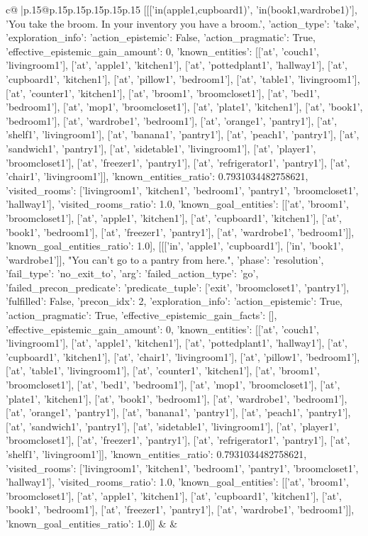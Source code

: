\documentclass{article}
\begin{document}
{\begin{supertabular}{c@{$\;$}|p{.15\linewidth}@{}p{.15\linewidth}p{.15\linewidth}p{.15\linewidth}p{.15\linewidth}p{.15\linewidth}}
{{{	 [[['in(apple1,cupboard1)', 'in(book1,wardrobe1)'], 'You take the broom. In your inventory you have a broom.', {'action_type': 'take', 'exploration_info': {'action_epistemic': False, 'action_pragmatic': True, 'effective_epistemic_gain_amount': 0, 'known_entities': [['at', 'couch1', 'livingroom1'], ['at', 'apple1', 'kitchen1'], ['at', 'pottedplant1', 'hallway1'], ['at', 'cupboard1', 'kitchen1'], ['at', 'pillow1', 'bedroom1'], ['at', 'table1', 'livingroom1'], ['at', 'counter1', 'kitchen1'], ['at', 'broom1', 'broomcloset1'], ['at', 'bed1', 'bedroom1'], ['at', 'mop1', 'broomcloset1'], ['at', 'plate1', 'kitchen1'], ['at', 'book1', 'bedroom1'], ['at', 'wardrobe1', 'bedroom1'], ['at', 'orange1', 'pantry1'], ['at', 'shelf1', 'livingroom1'], ['at', 'banana1', 'pantry1'], ['at', 'peach1', 'pantry1'], ['at', 'sandwich1', 'pantry1'], ['at', 'sidetable1', 'livingroom1'], ['at', 'player1', 'broomcloset1'], ['at', 'freezer1', 'pantry1'], ['at', 'refrigerator1', 'pantry1'], ['at', 'chair1', 'livingroom1']], 'known_entities_ratio': 0.7931034482758621, 'visited_rooms': ['livingroom1', 'kitchen1', 'bedroom1', 'pantry1', 'broomcloset1', 'hallway1'], 'visited_rooms_ratio': 1.0, 'known_goal_entities': [['at', 'broom1', 'broomcloset1'], ['at', 'apple1', 'kitchen1'], ['at', 'cupboard1', 'kitchen1'], ['at', 'book1', 'bedroom1'], ['at', 'freezer1', 'pantry1'], ['at', 'wardrobe1', 'bedroom1']], 'known_goal_entities_ratio': 1.0}}], [[['in', 'apple1', 'cupboard1'], ['in', 'book1', 'wardrobe1']], "You can't go to a pantry from here.", {'phase': 'resolution', 'fail_type': 'no_exit_to', 'arg': {'failed_action_type': 'go', 'failed_precon_predicate': {'predicate_tuple': ['exit', 'broomcloset1', 'pantry1'], 'fulfilled': False, 'precon_idx': 2}}, 'exploration_info': {'action_epistemic': True, 'action_pragmatic': True, 'effective_epistemic_gain_facts': [], 'effective_epistemic_gain_amount': 0, 'known_entities': [['at', 'couch1', 'livingroom1'], ['at', 'apple1', 'kitchen1'], ['at', 'pottedplant1', 'hallway1'], ['at', 'cupboard1', 'kitchen1'], ['at', 'chair1', 'livingroom1'], ['at', 'pillow1', 'bedroom1'], ['at', 'table1', 'livingroom1'], ['at', 'counter1', 'kitchen1'], ['at', 'broom1', 'broomcloset1'], ['at', 'bed1', 'bedroom1'], ['at', 'mop1', 'broomcloset1'], ['at', 'plate1', 'kitchen1'], ['at', 'book1', 'bedroom1'], ['at', 'wardrobe1', 'bedroom1'], ['at', 'orange1', 'pantry1'], ['at', 'banana1', 'pantry1'], ['at', 'peach1', 'pantry1'], ['at', 'sandwich1', 'pantry1'], ['at', 'sidetable1', 'livingroom1'], ['at', 'player1', 'broomcloset1'], ['at', 'freezer1', 'pantry1'], ['at', 'refrigerator1', 'pantry1'], ['at', 'shelf1', 'livingroom1']], 'known_entities_ratio': 0.7931034482758621, 'visited_rooms': ['livingroom1', 'kitchen1', 'bedroom1', 'pantry1', 'broomcloset1', 'hallway1'], 'visited_rooms_ratio': 1.0, 'known_goal_entities': [['at', 'broom1', 'broomcloset1'], ['at', 'apple1', 'kitchen1'], ['at', 'cupboard1', 'kitchen1'], ['at', 'book1', 'bedroom1'], ['at', 'freezer1', 'pantry1'], ['at', 'wardrobe1', 'bedroom1']], 'known_goal_entities_ratio': 1.0}}]] 
	  } 
	   } 
	   } 
	 & & \\ 
 


\end{supertabular}}
\end{document}
